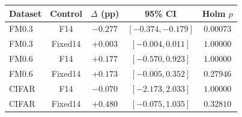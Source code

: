 \begin{tabular}{lcccc}
\toprule
Dataset & Control & $\Delta$ (pp) & 95\% CI & Holm $p$\\
\midrule
FM0.3 & F14 & $-0.277$ & $[-0.374,-0.179]$ & $0.00073$\\
FM0.3 & Fixed14 & $+0.003$ & $[-0.004,0.011]$ & $1.00000$\\
FM0.6 & F14 & $+0.177$ & $[-0.570,0.923]$ & $1.00000$\\
FM0.6 & Fixed14 & $+0.173$ & $[-0.005,0.352]$ & $0.27946$\\
CIFAR & F14 & $-0.070$ & $[-2.173,2.033]$ & $1.00000$\\
CIFAR & Fixed14 & $+0.480$ & $[-0.075,1.035]$ & $0.32810$\\
\bottomrule
\end{tabular}
